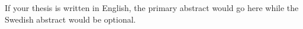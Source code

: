 
If your thesis is written in English, the primary abstract would go here while the Swedish abstract would be optional.

